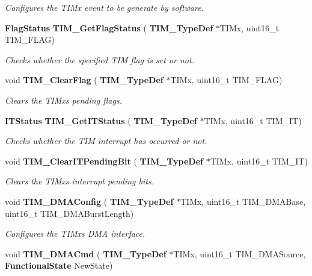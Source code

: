 \begin{DoxyCompactItemize}
\begin{DoxyCompactList}\small\item\em Configures the T\+I\+Mx event to be generate by software. \end{DoxyCompactList}\item 
\textbf{ Flag\+Status} \textbf{ T\+I\+M\+\_\+\+Get\+Flag\+Status} (\textbf{ T\+I\+M\+\_\+\+Type\+Def} $\ast$T\+I\+Mx, uint16\+\_\+t T\+I\+M\+\_\+\+F\+L\+AG)
\begin{DoxyCompactList}\small\item\em Checks whether the specified T\+IM flag is set or not. \end{DoxyCompactList}\item 
void \textbf{ T\+I\+M\+\_\+\+Clear\+Flag} (\textbf{ T\+I\+M\+\_\+\+Type\+Def} $\ast$T\+I\+Mx, uint16\+\_\+t T\+I\+M\+\_\+\+F\+L\+AG)
\begin{DoxyCompactList}\small\item\em Clears the T\+I\+Mx\textquotesingle{}s pending flags. \end{DoxyCompactList}\item 
\textbf{ I\+T\+Status} \textbf{ T\+I\+M\+\_\+\+Get\+I\+T\+Status} (\textbf{ T\+I\+M\+\_\+\+Type\+Def} $\ast$T\+I\+Mx, uint16\+\_\+t T\+I\+M\+\_\+\+IT)
\begin{DoxyCompactList}\small\item\em Checks whether the T\+IM interrupt has occurred or not. \end{DoxyCompactList}\item 
void \textbf{ T\+I\+M\+\_\+\+Clear\+I\+T\+Pending\+Bit} (\textbf{ T\+I\+M\+\_\+\+Type\+Def} $\ast$T\+I\+Mx, uint16\+\_\+t T\+I\+M\+\_\+\+IT)
\begin{DoxyCompactList}\small\item\em Clears the T\+I\+Mx\textquotesingle{}s interrupt pending bits. \end{DoxyCompactList}\item 
void \textbf{ T\+I\+M\+\_\+\+D\+M\+A\+Config} (\textbf{ T\+I\+M\+\_\+\+Type\+Def} $\ast$T\+I\+Mx, uint16\+\_\+t T\+I\+M\+\_\+\+D\+M\+A\+Base, uint16\+\_\+t T\+I\+M\+\_\+\+D\+M\+A\+Burst\+Length)
\begin{DoxyCompactList}\small\item\em Configures the T\+I\+Mx\textquotesingle{}s D\+MA interface. \end{DoxyCompactList}\item 
void \textbf{ T\+I\+M\+\_\+\+D\+M\+A\+Cmd} (\textbf{ T\+I\+M\+\_\+\+Type\+Def} $\ast$T\+I\+Mx, uint16\+\_\+t T\+I\+M\+\_\+\+D\+M\+A\+Source, \textbf{ Functional\+State} New\+State)

\end{DoxyCompactItemize}
